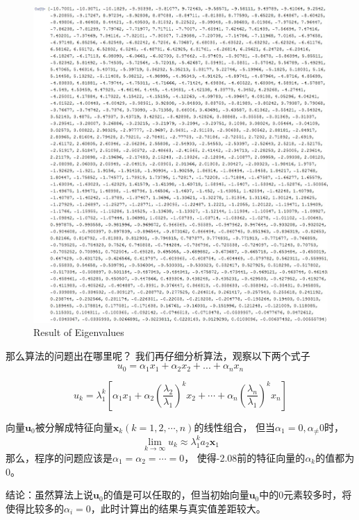 \begin{figure}[h]
\small
\centering
\includegraphics[width=17cm]{4.jpg}
\caption{Result of Eigenvalues} \label{fig:1}
\end{figure}
那么算法的问题出在哪里呢？
我们再仔细分析算法，观察以下两个式子
\[{u_0} = {\alpha _1}{x_1} + {\alpha _2}{x_2} + ... + {\alpha _n}{x_n}\]

\[{u_k} = \lambda _1^k\left[ {{\alpha _1}{x_1} + {\alpha _2}{{\left( {\frac{{{\lambda _2}}}{{{\lambda _1}}}} \right)}^k}{x_2} +  \cdots  + {\alpha _n}{{\left( {\frac{{{\lambda _n}}}{{{\lambda _1}}}} \right)}^k}{x_n}} \right]\]

向量$\bm{u}_0$被分解成特征向量$\bm{x}_k(k=1,2,\cdots,n)$的线性组合，
但当$\alpha_1=0,\alpha_\ne 0$时，
\[\mathop {\lim }\limits_{k \to \infty } {u_k} \approx \lambda _1^k{a_2}{{\bm{x}}_1}\]
那么，程序的问题应该是$\alpha_1=\alpha_2=\cdots=0$，
使得-2.08前的特征向量的$\alpha_k$的值都为0。

结论：虽然算法上说$\bm{u}_0$的值是可以任取的，但当初始向量$\bm{u}_0$中的0元素较多时，将使得比较多的$\alpha_i=0$，此时计算出的结果与真实值差距较大。







